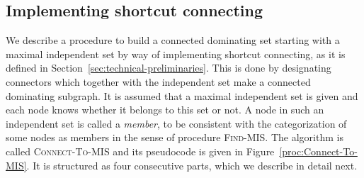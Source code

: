 \documentclass[11pt]{article}
\begin{document}
\subsection{Implementing shortcut connecting}

\label{sec:implementing-shortcut-connecting}



We describe a procedure to build a connected dominating set starting with a maximal independent set by way of implementing shortcut connecting, as it is defined in Section~\ref{sec:technical-preliminaries}.
This is done by designating  connectors which together with the independent set make a connected dominating subgraph.
It is assumed that a maximal independent set is given and each node knows whether it belongs to this set or not. 
A node in such an independent set is called a \emph{member}, to be consistent with the categorization  of some nodes as members in the sense of procedure \textsc{Find-MIS}.
The algorithm is called \textsc{Connect-To-MIS} and its pseudocode is given in Figure~\ref{proc:Connect-To-MIS}.
It is structured as four consecutive parts, which we describe in detail next.
\end{document}
